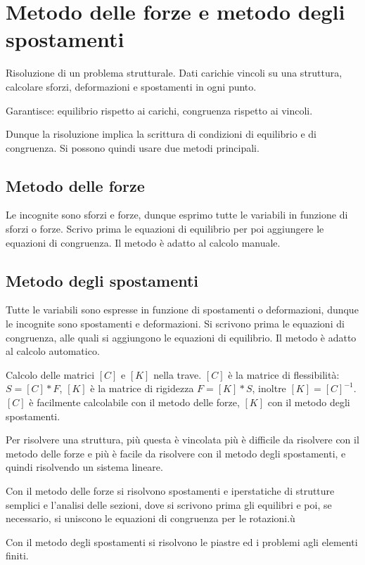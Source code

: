 \section{Metodo delle forze e metodo degli spostamenti}



\begin{definizioneBox}
Risoluzione di un problema strutturale. Dati carichie  vincoli su una struttura, calcolare sforzi, deformazioni e spostamenti in ogni punto.
\end{definizioneBox}

Garantisce: equilibrio rispetto ai carichi, congruenza rispetto ai vincoli.

Dunque la risoluzione implica la scrittura di condizioni di equilibrio e di congruenza. Si possono quindi usare due metodi principali.

\subsection*{Metodo delle forze}
Le incognite sono sforzi e forze, dunque esprimo tutte le variabili in funzione di sforzi o forze.
Scrivo prima le equazioni di equilibrio per poi aggiungere le equazioni di congruenza. Il metodo è adatto al calcolo manuale.



\subsection*{Metodo degli spostamenti}
Tutte le variabili sono espresse in funzione di spostamenti o deformazioni, dunque le incognite sono spostamenti e deformazioni.
Si scrivono prima le equazioni di congruenza, alle quali si aggiungono le equazioni di equilibrio. Il metodo è adatto al calcolo automatico.


\begin{esempioBox}
Calcolo delle matrici $[C]$ e $[K]$ nella trave. $[C]$ è la matrice di flessibilità: $S = [C] * F$, $[K]$ è la matrice di rigidezza $F = [K]*S$, inoltre $[K] = [C]^{-1}$.
$[C]$ è facilmente calcolabile con il metodo delle forze, $[K]$ con il metodo degli spostamenti.

Per risolvere una struttura, più questa è vincolata più è difficile da risolvere con il metodo delle forze e più è facile da risolvere con il metodo degli spostamenti, e quindi risolvendo un sistema lineare.

Con il metodo delle forze si risolvono spostamenti e iperstatiche di strutture semplici e l'analisi delle sezioni, dove si scrivono prima gli equilibri e poi, se necessario, si uniscono le equazioni di congruenza per le rotazioni.ù

Con il metodo degli spostamenti si risolvono le piastre ed i problemi agli elementi finiti.

\end{esempioBox}
